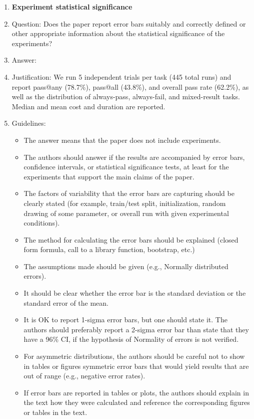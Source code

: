 \documentclass{article}
\begin{document}
\begin{enumerate}
\item {\bf Experiment statistical significance}
    \item[] Question: Does the paper report error bars suitably and correctly defined or other appropriate information about the statistical significance of the experiments?
    \item[] Answer: \answerYes{}
    \item[] Justification: We run 5 independent trials per task (445 total runs) and report pass@any (78.7\%), pass@all (43.8\%), and overall pass rate (62.2\%), as well as the distribution of always-pass, always-fail, and mixed-result tasks. Median and mean cost and duration are reported.
    \item[] Guidelines:
    \begin{itemize}
        \item The answer \answerNA{} means that the paper does not include experiments.
        \item The authors should answer \answerYes{} if the results are accompanied by error bars, confidence intervals, or statistical significance tests, at least for the experiments that support the main claims of the paper.
        \item The factors of variability that the error bars are capturing should be clearly stated (for example, train/test split, initialization, random drawing of some parameter, or overall run with given experimental conditions).
        \item The method for calculating the error bars should be explained (closed form formula, call to a library function, bootstrap, etc.)
        \item The assumptions made should be given (e.g., Normally distributed errors).
        \item It should be clear whether the error bar is the standard deviation or the standard error of the mean.
        \item It is OK to report 1-sigma error bars, but one should state it. The authors should preferably report a 2-sigma error bar than state that they have a 96\% CI, if the hypothesis of Normality of errors is not verified.
        \item For asymmetric distributions, the authors should be careful not to show in tables or figures symmetric error bars that would yield results that are out of range (e.g., negative error rates).
        \item If error bars are reported in tables or plots, the authors should explain in the text how they were calculated and reference the corresponding figures or tables in the text.
    \end{itemize}


\end{enumerate}
\end{document}
